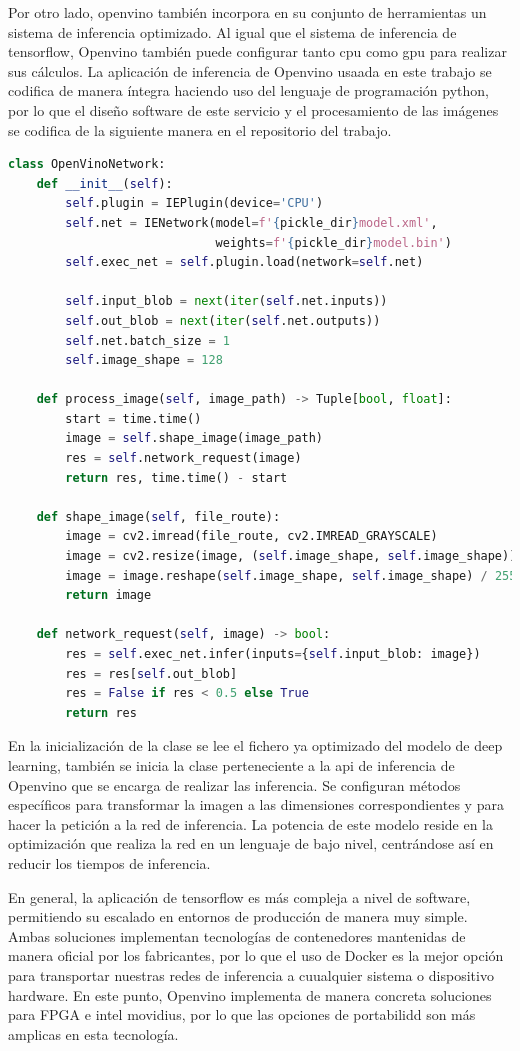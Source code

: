 Por otro lado, openvino también incorpora en su conjunto de herramientas un sistema de inferencia optimizado.
Al igual que el sistema de inferencia de tensorflow, Openvino también puede configurar tanto cpu como gpu para realizar sus cálculos.
La aplicación de inferencia de Openvino usaada en este trabajo se codifica de manera íntegra haciendo uso del lenguaje de programación python,
por lo que el diseño software de este servicio y el procesamiento de las imágenes se codifica de la siguiente manera en el repositorio del trabajo.

\begin{lstlisting}[caption=Clase de Openvino de la aplicación del trabajo.,
  label=b_label,
  language=python]
    class OpenVinoNetwork:
    def __init__(self):
        self.plugin = IEPlugin(device='CPU')
        self.net = IENetwork(model=f'{pickle_dir}model.xml',
                             weights=f'{pickle_dir}model.bin')
        self.exec_net = self.plugin.load(network=self.net)

        self.input_blob = next(iter(self.net.inputs))
        self.out_blob = next(iter(self.net.outputs))
        self.net.batch_size = 1
        self.image_shape = 128

    def process_image(self, image_path) -> Tuple[bool, float]:
        start = time.time()
        image = self.shape_image(image_path)
        res = self.network_request(image)
        return res, time.time() - start

    def shape_image(self, file_route):
        image = cv2.imread(file_route, cv2.IMREAD_GRAYSCALE)
        image = cv2.resize(image, (self.image_shape, self.image_shape))
        image = image.reshape(self.image_shape, self.image_shape) / 255.0
        return image

    def network_request(self, image) -> bool:
        res = self.exec_net.infer(inputs={self.input_blob: image})
        res = res[self.out_blob]
        res = False if res < 0.5 else True
        return res
\end{lstlisting}

En la inicialización de la clase se lee el fichero ya optimizado del modelo de deep learning, también se inicia la clase
perteneciente a la api de inferencia de Openvino que se encarga de realizar las inferencia.
Se configuran métodos específicos para transformar la imagen a las dimensiones correspondientes y para hacer la petición a la red de inferencia.
La potencia de este modelo reside en la optimización que realiza la red en un lenguaje de bajo nivel, centrándose así en reducir los tiempos de inferencia.

En general, la aplicación de tensorflow es más compleja a nivel de software, permitiendo su escalado en entornos de producción de manera muy simple.
Ambas soluciones implementan tecnologías de contenedores mantenidas de manera oficial por los fabricantes, por lo que el uso de Docker es la mejor opción para transportar
nuestras redes de inferencia a cuualquier sistema o dispositivo hardware.
En este punto, Openvino implementa de manera concreta soluciones para FPGA e intel movidius, por lo que las opciones de portabilidd son más amplicas en esta tecnología.


